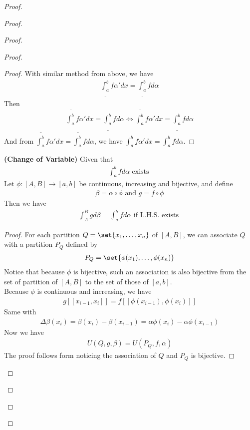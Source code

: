 \documentclass{report}
\begin{document}
\begin{proof}
\begin{proof}
\begin{proof}
\begin{proof}
\begin{proof}
With similar method from above, we have 
\begin{align*}
\underline{\int_a^b}f\alpha 'dx=\underline{\int_a^b}fd\alpha 
\end{align*}
Then 
\begin{align*}
\overline{\int_a^b}f\alpha 'dx=\underline{\int_a^b}fd\alpha \iff  \overline{\int_a^b}f\alpha 'dx=\underline{\int_a^b}fd\alpha 
\end{align*}
And from $\overline{\int_a^b}f\alpha 'dx=\overline{\int_a^b}fd\alpha $, we have $\int_a^b f\alpha 'dx =\int_a^b fd\alpha $. 
\end{proof}
\begin{theorem}
\label{7.3.2}
\textbf{(Change of Variable)} Given that 
\begin{align*}
\int_a^b fd\alpha \text{ exists }
\end{align*}
Let $\phi:[A,B]\to [a,b]$ be continuous, increasing and bijective, and define 
\begin{align*}
\beta = \alpha \circ  \phi \text{ and }g = f \circ  \phi 
\end{align*}
Then we have 
\begin{align*}
\int_A^B g d \beta =\int_a^b fd\alpha \text{ if L.H.S. exists }
\end{align*}
\end{theorem}
\begin{proof}
For each partition $Q=\set{x_1,\dots ,x_n}$ of  $[A,B]$, we can associate $Q$ with a partition $P_Q$ defined by 
 \begin{align*}
P_Q=\set{\phi (x_1) ,\dots ,\phi (x_n)}
\end{align*}
Notice that because $\phi$ is bijective, such an association is also bijective from the set of partition of $[A,B]$ to the set of those of $[a,b]$.\\ 

Because $\phi$ is continuous and increasing, we have  
\begin{align*}
  g[[x_{i-1},x_i]]=f [[\phi (x_{i-1}), \phi (x_i)]]
\end{align*}
Same with 
\begin{align*}
\Delta \beta (x_i)=\beta (x_i)-\beta  (x_{i-1})= \alpha \phi (x_i)-\alpha \phi (x_{i-1})
\end{align*}
Now we have 
\begin{align*}
U(Q,g,\beta )= U(P_Q,f,\alpha )
\end{align*}
The proof follows form noticing the association of $Q$ and  $P_Q$ is bijective. 


\end{proof}
\end{proof}
\end{proof}
\end{proof}
\end{proof}
\end{document}
